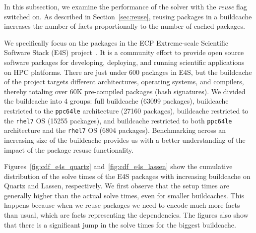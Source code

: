 In this subsection, we examine the performance of the solver with the \emph{reuse} flag switched on. As described in Section~\ref{sec:reuse}, reusing packages in a buildcache increases the number of facts proportionally to the number of cached packages.

We specifically focus on the packages in the ECP Extreme-scale Scientific Software Stack (E4S) project~\cite{e4s}. It is a community effort to provide open source software packages for developing, deploying, and running scientific applications on HPC platforms. There are just under 600 packages in E4S, but the buildcache of the project targets different architectures, operating systems, and compilers, thereby totaling over 60K pre-compiled packages (hash signatures). We divided the buildcache into 4 groups: full buildcache (63099 packages), buildcache restricted to the \texttt{ppc64le} architecture (27160 packages), buildcache restricted to the \texttt{rhel7} OS (15255 packages), and buildcache restricted to both \texttt{ppc64le} architecture and the \texttt{rhel7} OS (6804 packages). Benchmarking across an increasing size of the buildcache provides us with a better understanding of the impact of the package resuse functionality.





Figures~\ref{fig:cdf_e4s_quartz} and~\ref{fig:cdf_e4s_lassen} show the cumulative distribution of the solve times of the E4S packages with increasing buildcache on Quartz and Lassen, respectively. We first observe that the setup times are generally higher than the actual solve times, even for smaller buildcaches. This happens because when we reuse packages we need to encode much more facts than usual, which are facts representing the dependencies. The figures also show that there is a significant jump in the solve times for the biggest buildcache.

